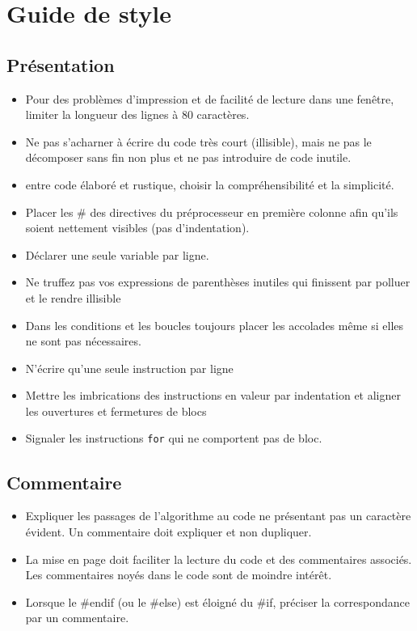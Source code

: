 \documentclass[10pt,a4paper,twoside]{article}
\begin{document}
\newpage
\section{Guide de style}
\subsection{Présentation}
\begin{itemize}
\item Pour des problèmes d'impression et de facilité de lecture dans une fenêtre, limiter la longueur des lignes à 80 caractères.
\item Ne pas s'acharner à écrire du code très court (illisible), mais ne pas le décomposer sans fin non plus et ne pas introduire de code inutile.
\item entre code élaboré et rustique, choisir la compréhensibilité et la simplicité.
\item Placer les \# des directives du préprocesseur en première colonne afin qu'ils soient nettement visibles (pas d'indentation).
\item Déclarer une seule variable par ligne.
\item Ne truffez pas vos expressions de parenthèses inutiles qui finissent par polluer et le rendre illisible
\item Dans les conditions et les boucles toujours placer les accolades même si elles ne sont pas nécessaires.
\item N'écrire qu'une seule instruction par ligne
\item Mettre les imbrications des instructions en valeur par indentation et aligner les ouvertures et fermetures de blocs
\item Signaler les instructions \verb)for) qui ne comportent pas de bloc.
\end{itemize}
\subsection{Commentaire}
\begin{itemize}
\item Expliquer les passages de l'algorithme au code ne présentant pas un caractère évident. Un commentaire doit expliquer et non dupliquer.
\item La mise en page doit faciliter la lecture du code et des commentaires associés. Les commentaires noyés dans le code sont de moindre intérêt.
\item Lorsque le \#endif (ou le \#else) est éloigné du \#if, préciser la correspondance par un commentaire.
\end{itemize}
\end{document}
